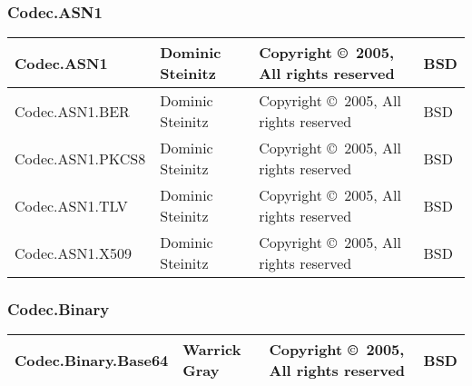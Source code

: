 \documentclass{article}
\begin{document}
\subsubsection{Codec.ASN1}
\begin{tabular}{|p{6cm}|p{3cm}|p{3cm}|p{1cm}|}
\hline\hline
Codec.ASN1 & Dominic Steinitz & 
Copyright \copyright\ 2005, All rights reserved & BSD \\
\hline
Codec.ASN1.BER & Dominic Steinitz & 
Copyright \copyright\ 2005, All rights reserved & BSD \\
\hline
Codec.ASN1.PKCS8 & Dominic Steinitz & 
Copyright \copyright\ 2005, All rights reserved & BSD \\
\hline
Codec.ASN1.TLV & Dominic Steinitz & 
Copyright \copyright\ 2005, All rights reserved & BSD \\
\hline
Codec.ASN1.X509 & Dominic Steinitz & 
Copyright \copyright\ 2005, All rights reserved & BSD \\
\hline\hline
\end{tabular}

\subsubsection{Codec.Binary}
\begin{tabular}{|p{6cm}|p{3cm}|p{3cm}|p{1cm}|}
\hline\hline
Codec.Binary.Base64 & Warrick Gray & 
Copyright \copyright\ 2005, All rights reserved & BSD \\
\hline\hline
\end{tabular}
\end{document}
